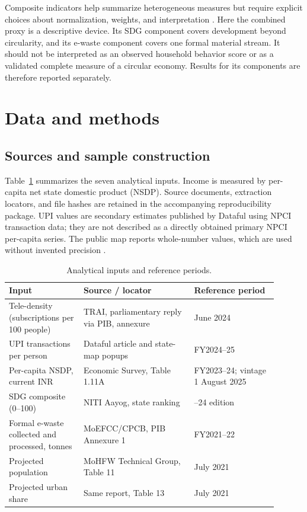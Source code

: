 \documentclass[11pt,a4paper]{article}
\begin{document}
Composite indicators help summarize heterogeneous measures but require explicit choices about normalization, weights, and interpretation \cite{oecd}. Here the combined proxy is a descriptive device. Its SDG component covers development beyond circularity, and its e-waste component covers one formal material stream. It should not be interpreted as an observed household behavior score or as a validated complete measure of a circular economy. Results for its components are therefore reported separately.

\section{Data and methods}
\subsection{Sources and sample construction}
Table~\ref{tab:sources} summarizes the seven analytical inputs. Income is measured by per-capita net state domestic product (NSDP). Source documents, extraction locators, and file hashes are retained in the accompanying reproducibility package. UPI values are secondary estimates published by Dataful using NPCI transaction data; they are not described as a directly obtained primary NPCI per-capita series. The public map reports whole-number values, which are used without invented precision \cite{dataful}.

\begin{table}[htbp]
\centering\small
\caption{Analytical inputs and reference periods.}\label{tab:sources}
\begin{tabular}{@{}>{\raggedright\arraybackslash}p{0.25\linewidth}>{\raggedright\arraybackslash}p{0.37\linewidth}>{\raggedright\arraybackslash}p{0.28\linewidth}@{}}
\toprule Input & Source / locator & Reference period \\
\midrule
Tele-density (subscriptions per 100 people) & TRAI, parliamentary reply via PIB, annexure \cite{trai} & 30 June 2024 \\
UPI transactions per person & Dataful article and state-map popups \cite{dataful} & FY2024--25 \\
Per-capita NSDP, current INR & Economic Survey, Table 1.11A \cite{nsdp} & FY2023--24; vintage 1 August 2025 \\
SDG composite (0--100) & NITI Aayog, state ranking \cite{sdg} & 2023--24 edition \\
Formal e-waste collected and processed, tonnes & MoEFCC/CPCB, PIB Annexure 1 \cite{cpcb} & FY2021--22 \\
Projected population & MoHFW Technical Group, Table 11 \cite{population} & 1 July 2021 \\
Projected urban share & Same report, Table 13 \cite{population} & 1 July 2021 \\
\bottomrule
\end{tabular}
\end{table}
\end{document}
